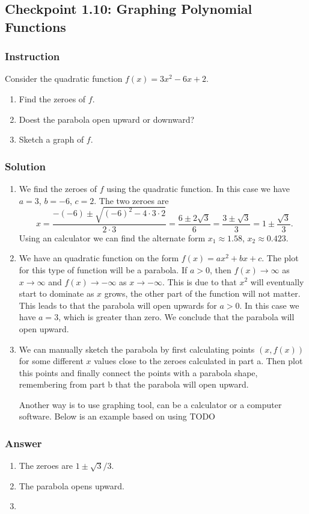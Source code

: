 \subsection*{Checkpoint 1.10: Graphing Polynomial Functions}

\subsubsection*{Instruction}

Consider the quadratic function $ f(x) = 3x^2 -6x + 2 $.

\begin{enumerate}[label = (\alph*)]
  \item
    Find the zeroes of $ f $.
  \item
    Doest the parabola open upward or downward?
  \item
    Sketch a graph of $ f $.
\end{enumerate}

\subsubsection*{Solution}

\begin{enumerate}[label = (\alph*)]
  \item
    We find the zeroes of $ f $ using the quadratic function. In this case we have $ a = 3 $, $ b = -6 $, $ c = 2 $. The two zeroes are
    $$ \phantom{.}
    x = \frac{-(-6) \pm \sqrt{(-6)^2 - 4 \cdot 3 \cdot 2}}{2 \cdot 3} = \frac{6 \pm 2\sqrt{3}}{6} = \frac{3 \pm \sqrt{3}}{3} = 1 \pm \frac{\sqrt{3}}{3}
    .$$
    Using an calculator we can find the alternate form $ x_1 \approx 1.58 $, $ x_2 \approx 0.423 $.
  \item
    We have an quadratic function on the form $ f(x) = ax^2 + bx + c $. The plot for this type of function will be a parabola. If $ a > 0 $, then $ f(x) \to \infty $ as $ x \to \infty $ and $ f(x) \to -\infty $ as $ x \to -\infty $. This is due to that $ x^2 $ will eventually start to dominate as $ x $ grows, the other part of the function will not matter. This leads to that the parabola will open upwards for $ a > 0 $. In this case we have $ a = 3 $, which is greater than zero. We conclude that the parabola will open upward.
  \item
    We can manually sketch the parabola by first calculating points $ (x, f(x)) $ for some different $ x $ values close to the zeroes calculated in part a. Then plot this points and finally connect the points with a parabola shape, remembering from part b that the parabola will open upward.

    Another way is to use graphing tool, can be a calculator or a computer software. Below is an example based on using TODO
\end{enumerate}

\subsubsection{Answer}

\begin{enumerate}[label = (\alph*)]
  \item
    The zeroes are $ 1 \pm {\sqrt{3}}/3 $.
  \item
    The parabola opens upward.
  \item
\end{enumerate}

